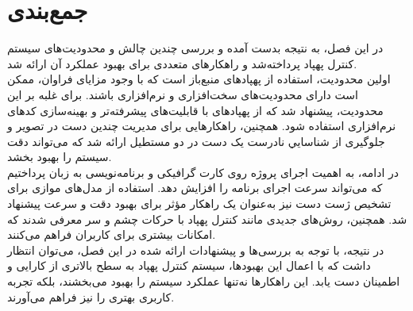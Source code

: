 \section{جمع‌بندی}
در این فصل، به نتیجه‌ بدست آمده و بررسی چندین چالش‌ و محدودیت‌های سیستم کنترل پهپاد پرداخته‌شد و راهکارهای متعددی برای بهبود عملکرد آن ارائه شد. 
\\
اولین محدودیت، استفاده از پهپادهای منبع‌باز است که با وجود مزایای فراوان، ممکن است دارای محدودیت‌های سخت‌افزاری و نرم‌افزاری باشند. برای غلبه بر این محدودیت، پیشنهاد شد که از پهپادهای با قابلیت‌های پیشرفته‌تر و 
بهینه‌سازی کدهای نرم‌افزاری استفاده شود. همچنین، راهکارهایی برای مدیریت چندین دست در تصویر و جلوگیری از شناسايي نادرست یک دست در دو مستطیل ارائه شد که می‌تواند دقت سیستم را بهبود بخشد.
\\
در ادامه، به اهمیت اجرای پروژه روی کارت گرافیکی و برنامه‌نویسی به زبان  پرداختیم که می‌تواند سرعت اجرای برنامه را افزایش دهد. استفاده از مدل‌های موازی برای تشخیص ژست دست نیز به‌عنوان یک راهکار مؤثر برای بهبود 
دقت و سرعت پیشنهاد شد. همچنین، روش‌های جدیدی مانند کنترل پهپاد با حرکات چشم و سر معرفی شدند که امکانات بیشتری برای کاربران فراهم می‌کنند.
\\
در نتیجه، با توجه به بررسی‌ها و پیشنهادات ارائه شده در این فصل، می‌توان انتظار داشت که با اعمال این بهبودها، سیستم کنترل پهپاد به سطح بالاتری از کارایی و اطمینان دست یابد. این راهکارها نه‌تنها عملکرد سیستم را بهبود می‌بخشند، بلکه تجربه کاربری بهتری را نیز فراهم می‌آورند.